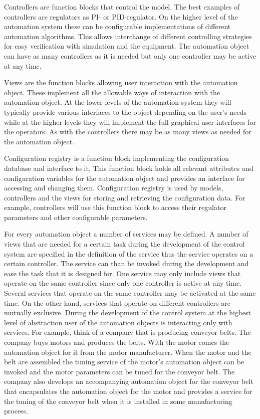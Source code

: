 Controllers are function blocks that control the model. The
best examples of controllers are regulators as PI- or
PID-regulator. On the higher level of the automation system
these can be configurable implementations of different
automation algorithms. This allows interchange of different
controlling strategies for easy verification with simulation
and the equipment. The automation object can have as many
controllers as it is needed but only one controller may be
active at any time.

Views are the function blocks allowing user interaction with
the automation object. These implement all the allowable ways
of interaction with the automation object. At the lower
levels of the automation system they will typically provide
various interfaces to the object depending on the user's
needs while at the higher levels they will implement the
full graphical user interfaces for the operators. As with
the controllers there may be as many views as needed for the
automation object.

Configuration registry is a function block implementing the
configuration database and interface to it. This function
block holds all relevant attributes and configuration
variables for the automation object and provides an
interface for accessing and changing them. Configuration
registry is used by models, controllers and the views for
storing and retrieving the configuration data. For example,
controllers will use this function block to access their
regulator parameters and other configurable parameters.

For every automation object a number of services may be
defined. A number of views that are needed for a certain
task during the development of the control system are
specified in the definition of the service thus the service
operates on a certain controller. The service can than be
invoked during the development and ease the task that it is
designed for. One service may only include views that
operate on the same controller since only one controller is
active at any time. Several services that operate on the
same controller may be activated at the same time. On the
other hand, services that operate on different controllers
are mutually exclusive. During the development of the
control system at the highest level of abstraction user of
the automation objects is interacting only with services.
For example, think of a company that is producing conveyor
belts. The company buys motors and produces the belts. With
the motor comes the automation object for it from the motor
manufacturer. When the motor and the belt are assembled the
tuning service of the motor's automation object can be
invoked and the motor parameters can be tuned for the
conveyor belt. The company also develops an accompanying
automation object for the conveyor belt that encapsulates
the automation object for the motor and provides a service
for the tuning of the conveyor belt when it is installed in
some manufacturing process.

